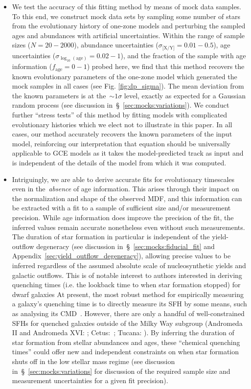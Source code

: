 \documentclass[ms.tex]{subfiles}
\begin{document}
\begin{itemize}
	\item We test the accuracy of this fitting method by means of mock data
	samples.
	To this end, we construct mock data sets by sampling some number of stars
	from the evolutionary history of one-zone models and perturbing the sampled
	ages and abundances with artificial uncertainties.
	Within the range of sample sizes ($N = 20 - 2000$), abundance uncertainties
	($\sigma_\text{[X/Y]} = 0.01 - 0.5$), age uncertainties
	($\sigma_{\log_{10}(\text{age})} = 0.02 - 1$), and the fraction of the
	sample with age information ($f_\text{age} = 0 - 1$) probed here, we find
	that this method recovers the known evolutionary parameters of the one-zone
	model which generated the mock samples in all cases (see Fig.
	\ref{fig:dp_sigma}).
	The mean deviation from the known parameters is at the~$\sim1\sigma$ level,
	exactly as expected for a Gaussian random process (see discussion
	in~\S~\ref{sec:mocks:variations}).
	We conduct further ``stress tests'' of this method by fitting models with
	complicated evolutionary histories which we elect not to illustrate in this
	paper.
	In all cases, our method accurately recovers the known parameters of the
	input model, reinforcing our interpretation that equation
	 should be universally applicable to GCE models as it
	takes the model-predicted track as input and is independent of the details
	of the model from which it was computed.

	\item Intriguingly, we are able to derive accurate fits for evolutionary
	timescales even in the~\textit{absence} of age information.
	This arises through their impact on the normalization and shape of the
	observed MDF, and this information can be extracted with a fit to a sample
	of sufficient size and/or measurement precision.
	While age information does improve the precision of the fit, the inferred
	values remain accurate nonetheless even without such measurements.
	The duration of star formation in particular is independent of the
	yield-outflow degeneracy (see discussion in~\S~\ref{sec:mocks:fiducial_fit}
	and Appendix~\ref{sec:yield_outflow_degeneracy}), allowing precise values
	to be inferred regardless of the assumed absolute scale of nucleosynthetic
	yields and galactic outflows.
	This is of notable interest to authors interested in deriving quenching
	times (i.e. the lookback time to when star formation stopped) for dwarf
	galaxies
	At present, the most robust method for empirically measuring a galaxy's
	quenching time is to directly measure its SFH by some means, such as
	analysing its CMD~\citep[e.g.][]{Sohn2013, Weisz2015}.
	However, there are only a handful of well-constrained SFHs for quenched
	galaxies outside of the Milky Way subgroup (Andromeda II and Andromeda XVI:
	\citealp{Weisz2014a}; Cetus:~\citealp{Monelli2010a}; Tucana:
	\citealp{Monelli2010b}).
	By inferring the duration of star formation from stellar abundances and
	ages, these ``chemical quenching times'' could offer new and independent
	constraints on when star formation shuts off in the low stellar mass
	regime (see discussion in~\S~\ref{sec:mocks:variations} for discussion of
	the required sample size and measurement uncertainties for a given fit
	precision).


\end{itemize}
\end{document}
